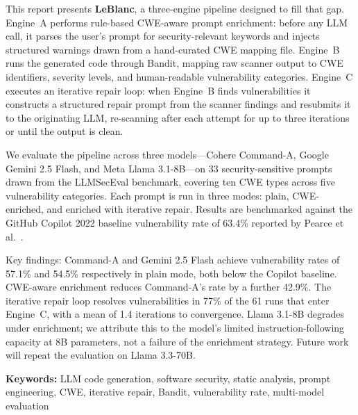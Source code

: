 \documentclass[12pt,a4paper]{report}
\begin{document}
\vspace{0.15in}
\noindent This report presents \textbf{LeBlanc}, a three-engine pipeline designed
to fill that gap. Engine~A performs rule-based CWE-aware prompt enrichment: before
any LLM call, it parses the user's prompt for security-relevant keywords and
injects structured warnings drawn from a hand-curated CWE mapping file.
Engine~B runs the generated code through Bandit, mapping raw scanner output to
CWE identifiers, severity levels, and human-readable vulnerability categories.
Engine~C executes an iterative repair loop: when Engine~B finds vulnerabilities
it constructs a structured repair prompt from the scanner findings and resubmits
it to the originating LLM, re-scanning after each attempt for up to three
iterations or until the output is clean.

\vspace{0.15in}
\noindent We evaluate the pipeline across three models---Cohere Command-A, Google
Gemini 2.5 Flash, and Meta Llama 3.1-8B---on 33 security-sensitive prompts drawn
from the LLMSecEval benchmark, covering ten CWE types across five vulnerability
categories. Each prompt is run in three modes: plain, CWE-enriched, and enriched
with iterative repair. Results are benchmarked against the GitHub Copilot 2022
baseline vulnerability rate of 63.4\% reported by Pearce et
al.~\cite{pearce2022asleep}.

\vspace{0.15in}
\noindent Key findings: Command-A and Gemini 2.5 Flash achieve vulnerability rates
of 57.1\% and 54.5\% respectively in plain mode, both below the Copilot baseline.
CWE-aware enrichment reduces Command-A's rate by a further 42.9\%. The iterative
repair loop resolves vulnerabilities in 77\% of the 61 runs that enter Engine~C,
with a mean of 1.4 iterations to convergence. Llama 3.1-8B degrades under
enrichment; we attribute this to the model's limited instruction-following
capacity at 8B parameters, not a failure of the enrichment strategy. Future work
will repeat the evaluation on Llama 3.3-70B.

\vspace{0.18in}
\noindent\textbf{Keywords:} LLM code generation, software security, static
analysis, prompt engineering, CWE, iterative repair, Bandit, vulnerability rate,
multi-model evaluation

\newpage
\tableofcontents
\newpage
\listoffigures
\newpage
\listoftables
\end{document}
